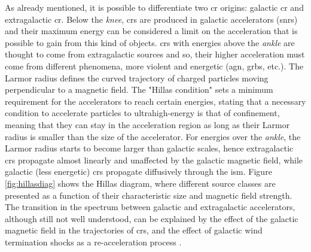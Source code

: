 \documentclass[main.tex]{subfiles}
\begin{document}
    As already mentioned, it is possible to differentiate two \gls{cr} origins: galactic \gls{cr} and extragalactic \gls{cr}. Below the \textit{knee}, \glspl{cr} are produced in galactic accelerators (\glspl{snr}) and their maximum energy can be considered a limit on the acceleration that is possible to gain from this kind of objects. \glspl{cr} with energies above the \textit{ankle} are thought to come from extragalactic sources and so, their higher acceleration must come from different phenomena, more violent and energetic (\gls{agn}, \glspl{grb}, etc.). The Larmor radius defines the curved trajectory of charged particles moving perpendicular to a magnetic field. The "Hillas condition" \cite{1984hillascondition} sets a minimum requirement for the accelerators to reach certain energies, stating that a necessary condition to accelerate particles to ultrahigh-energy is that of confinement, meaning that they can stay in the acceleration region as long as their Larmor radius is smaller than the size of the accelerator. For energies over the \textit{ankle}, the Larmor radius starts to become larger than galactic scales, hence extragalactic \glspl{cr} propagate almost linearly and unaffected by the galactic magnetic field, while galactic (less energetic) \glspl{cr} propagate diffusively through the \gls{ism}. Figure \ref{fig:hillasdiag} shows the Hillas diagram, where different source classes are presented as a function of their characteristic size and magnetic field strength.\\
The transition in the spectrum between galactic and extragalactic accelerators, although still not well understood, can be explained by the effect of the galactic magnetic field in the trajectories of \glspl{cr}, and the effect of galactic wind termination shocks as a re-acceleration process \cite{2016CRSpectrum}.
\end{document}
